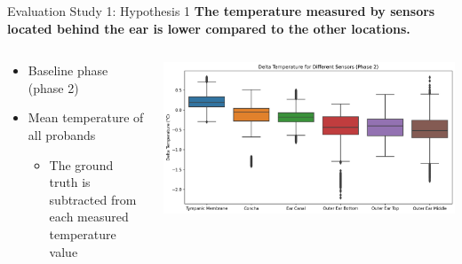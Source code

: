 \documentclass[en]{sdqbeamer}
\begin{document}
\begin{frame}{Evaluation Study 1: Hypothesis 1}
    \textbf{The temperature measured by sensors located behind the ear is lower compared to the other locations.}
    \begin{center}
      \begin{columns}[T]
        \begin{column}{.3\textwidth}
        \vspace{10pt}
          \begin{itemize}
              \item Baseline phase (phase 2)
              \item Mean temperature of all probands
              \begin{itemize}
                  \item The ground truth is subtracted from each measured temperature value
              \end{itemize}
          \end{itemize}
        \end{column}
        
        \begin{column}{.66\textwidth}
        \includegraphics[width=0.99\linewidth]{../thesis-doc/images/study1/hypothesis1/hypothesis1_boxplot_phase_2.png}
        \end{column}
      \end{columns}
    \end{center}
\end{frame}
\end{document}
